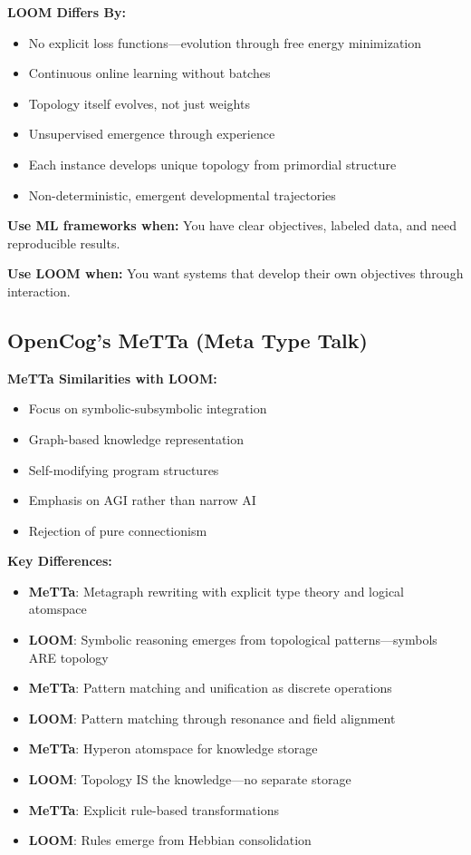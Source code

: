 \documentclass[12pt,a4paper,openany]{book} %
\begin{document}
\textbf{LOOM Differs By:}
\begin{itemize}
\item No explicit loss functions—evolution through free energy minimization
\item Continuous online learning without batches
\item Topology itself evolves, not just weights
\item Unsupervised emergence through experience
\item Each instance develops unique topology from primordial structure
\item Non-deterministic, emergent developmental trajectories
\end{itemize}

\textbf{Use ML frameworks when:} You have clear objectives, labeled data, and need reproducible results.

\textbf{Use LOOM when:} You want systems that develop their own objectives through interaction.

\subsection{OpenCog's MeTTa (Meta Type Talk)}

\textbf{MeTTa Similarities with LOOM:}
\begin{itemize}
\item Focus on symbolic-subsymbolic integration
\item Graph-based knowledge representation
\item Self-modifying program structures
\item Emphasis on AGI rather than narrow AI
\item Rejection of pure connectionism
\end{itemize}

\textbf{Key Differences:}
\begin{itemize}
\item \textbf{MeTTa}: Metagraph rewriting with explicit type theory and logical atomspace
\item \textbf{LOOM}: Symbolic reasoning emerges from topological patterns—symbols ARE topology
\item \textbf{MeTTa}: Pattern matching and unification as discrete operations
\item \textbf{LOOM}: Pattern matching through resonance and field alignment
\item \textbf{MeTTa}: Hyperon atomspace for knowledge storage
\item \textbf{LOOM}: Topology IS the knowledge—no separate storage
\item \textbf{MeTTa}: Explicit rule-based transformations
\item \textbf{LOOM}: Rules emerge from Hebbian consolidation
\end{itemize}
\end{document}
